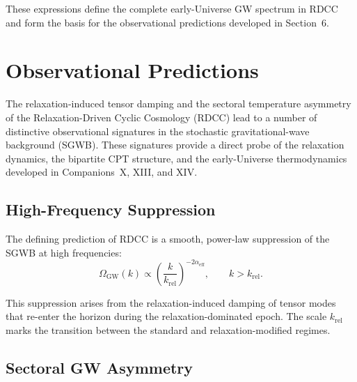\documentclass[11pt,a4paper]{article}
\begin{document}
These expressions define the complete early-Universe GW spectrum in RDCC and form the
basis for the observational predictions developed in Section~6.


\section{Observational Predictions}

The relaxation-induced tensor damping and the sectoral temperature asymmetry of the
Relaxation-Driven Cyclic Cosmology (RDCC) lead to a number of distinctive observational
signatures in the stochastic gravitational-wave background (SGWB). These signatures provide a
direct probe of the relaxation dynamics, the bipartite CPT structure, and the early-Universe
thermodynamics developed in Companions~X, XIII, and XIV.


\subsection{High-Frequency Suppression}

The defining prediction of RDCC is a smooth, power-law suppression of the SGWB at high
frequencies:
\begin{equation}
\Omega_{\mathrm{GW}}(k)
\propto
\left( \frac{k}{k_{\mathrm{rel}}} \right)^{-2\alpha_{\mathrm{eff}}},
\qquad
k > k_{\mathrm{rel}}.
\end{equation}

This suppression arises from the relaxation-induced damping of tensor modes that re-enter the
horizon during the relaxation-dominated epoch. The scale \(k_{\mathrm{rel}}\) marks the transition
between the standard and relaxation-modified regimes.


\subsection{Sectoral GW Asymmetry}
\end{document}
